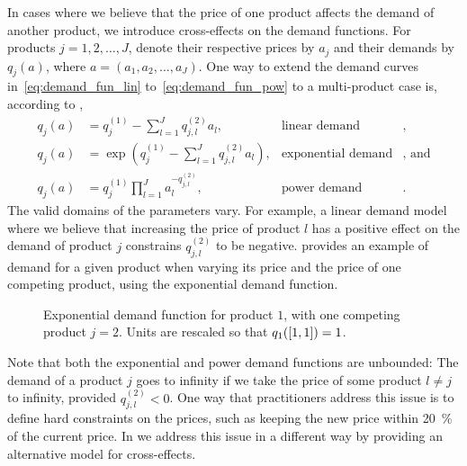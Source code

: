 \documentclass[main.tex]{subfiles}
\begin{document}
In cases where we believe that the price of one product affects the
demand of another product, we introduce cross-effects on the demand
functions. For products $j=1,2,\dots,J$, denote their respective prices by
$a_j$ and their demands by $q_j(a)$, where $a=(a_1,a_2,\dots,a_J)$.
One way to extend the demand curves in~\eqref{eq:demand_fun_lin}
to~\eqref{eq:demand_fun_pow} to a multi-product case is, according to \citet{talluri2006theory},
\begin{align}
  q_j(a)&=q_{j}^{(1)}-\sum_{l=1}^Jq_{j,l}^{(2)}a_l,
  &\text{linear demand}&,\\
  q_j(a)&=\exp\left( q_{j}^{(1)}-\sum_{l=1}^Jq_{j,l}^{(2)}a_l
          \right),
  &\text{exponential demand}&\text{, and}\\
  q_j(a)&=q_j^{(1)}\prod_{l=1}^Ja_l^{-q_{j,l}^{(2)}},
  &\text{power demand}&.
\end{align}
The valid domains of the parameters vary. For example, a linear demand
model where we believe that increasing the price of product $l$ has a
positive effect on the demand of product $j$ constrains
$q_{j,l}^{(2)}$ to be negative. 
provides an example of demand for a given product when varying
its price and the price of one competing product, using the exponential demand function.
\begin{figure}[htbp]
  \centering
  \caption[Exponential demand function]{Exponential demand function for product $1$, with one
    competing product $j=2$.
    Units are rescaled so that $q_1(\left[1,1\right])=1$.
  }\label{fig:demand_exponential_two}
\end{figure}

\begin{remark}
  Note that both the exponential
  and power demand functions are unbounded: The demand of a product
  $j$ goes to infinity if we take the price of some product $l\neq j$
  to infinity, provided $q_{j,l}^{(2)}<0$. One way that practitioners
  address this issue is to define hard constraints on the prices, such as
  keeping the new price within \SI{20}{\percent} of the current price.
  In  we address this issue in a different way by
  providing an alternative model for cross-effects.
\end{remark}
\end{document}
